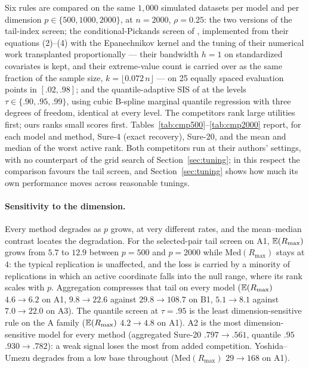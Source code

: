 Six rules are compared on the same $1{,}000$ simulated datasets per
model and per dimension $p\in\{500,1000,2000\}$, at $n=2000$,
$\rho=0.25$: the two versions of the tail-index screen; the
conditional-Pickands screen of \citet{yoshidaUmezu2026}, implemented
from their equations (2)--(4) with the Epanechnikov kernel and the
tuning of their numerical work transplanted proportionally --- their
bandwidth $h=1$ on standardized covariates is kept, and their
extreme-value count is carried over as the same fraction of the sample
size, $k=\lfloor0.072\,n\rfloor$ --- on 25 equally spaced evaluation
points in $[.02,.98]$; and the quantile-adaptive SIS of \citet{heWangHong2013} at
the levels $\tau\in\{.90,.95,.99\}$, using cubic B-spline marginal
quantile regression with three degrees of freedom, identical at every
level. The competitors rank large utilities first; ours ranks small
scores first. Tables~\ref{tab:cmp500}--\ref{tab:cmp2000} report, for
each model and method, Sure-4 (exact recovery), Sure-20, and the mean
and median of the worst active rank. Both competitors run at their
authors' settings, with no counterpart of the grid search of
Section~\ref{sec:tuning}; in this respect the comparison favours the
tail screen, and Section~\ref{sec:tuning} shows how much its own
performance moves across reasonable tunings.






\paragraph{Sensitivity to the dimension.}
Every method degrades as $p$ grows, at very different rates, and the
mean--median contrast locates the degradation. For the selected-pair
tail screen on A1, $\mathbb E(R_{\max})$ grows from $5.7$ to $12.9$ between
$p=500$ and $p=2000$ while $\mathrm{Med}(R_{\max})$ stays at $4$: the
typical replication is unaffected, and the loss is carried by a
minority of replications in which an active coordinate falls into the
null range, where its rank scales with $p$. Aggregation compresses that
tail on every model ($\mathbb E(R_{\max})$ $4.6\to6.2$ on A1, $9.8\to22.6$
against $29.8\to108.7$ on B1, $5.1\to8.1$ against $7.0\to22.0$ on A3).
The quantile screen at $\tau=.95$ is the least dimension-sensitive rule
on the A family ($\mathbb E(R_{\max})$ $4.2\to4.8$ on A1). A2 is the most
dimension-sensitive model for every method (aggregated Sure-20
$.797\to.561$, quantile $.95$ $.930\to.782$): a weak signal loses the
most from added competition. Yoshida--Umezu degrades from a low base
throughout ($\mathrm{Med}(R_{\max})$ $29\to168$ on A1).

